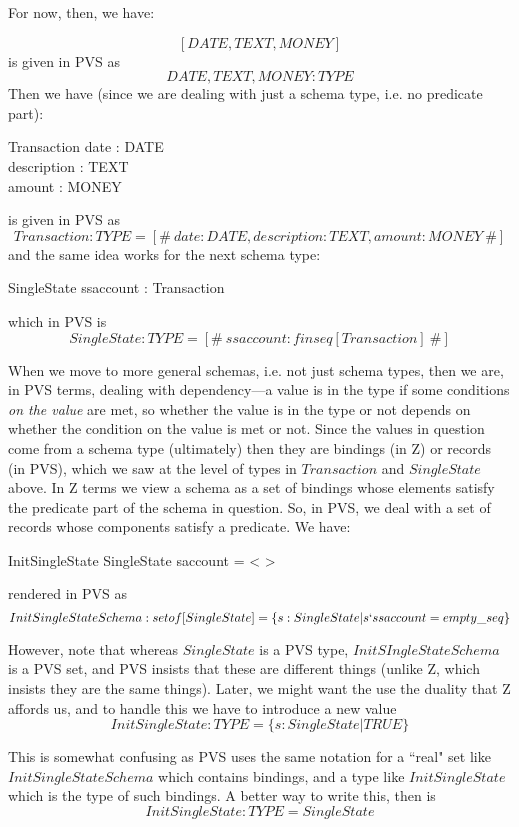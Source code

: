\documentclass[11pt]{amsart}
\begin{document}
For now, then, we have:

\[
[DATE, TEXT, MONEY]
\]
is given in PVS as
\[
DATE, TEXT, MONEY : TYPE
\]
Then we have (since we are dealing with just a schema type, i.e. no predicate part):
\begin{schema}{Transaction}
date : DATE\\
description : TEXT\\
amount : MONEY
\end{schema}
is given in PVS as
\[
Transaction : TYPE = [\#\ date : DATE, description : TEXT, amount : MONEY\ \#]
\]
and the same idea works for the next schema type:
\begin{schema}{SingleState}
ssaccount : \seq Transaction
\end{schema}
which in PVS is
\[
SingleState : TYPE = [\#\ ssaccount :  finseq[Transaction]\ \#]
\]

When we move to more general schemas, i.e. not just schema types, then we are, in PVS terms, dealing with dependency---a value is in the type if some conditions \emph{on the value} are met, so whether the value is in the type or not depends on whether the condition on the value is met or not. Since the values in question come from a schema type (ultimately) then they are bindings (in Z) or records (in PVS), which we saw at the level of types in $Transaction$ and $SingleState$ above. In Z terms we view a schema as a set of bindings whose elements satisfy the predicate part of the schema in question. So, in PVS, we deal with a set of records whose components satisfy a predicate. We have:

\begin{schema}{InitSingleState}
SingleState
\where
saccount = < >
\end{schema}
rendered in PVS as
\[
InitSingleStateSchema : setof[SingleState] = \{ s : SingleState | s`ssaccount = empty\_seq\}
\]

However, note that whereas $SingleState$ is a PVS type, $InitSIngleStateSchema$ is a PVS set, and PVS insists that these are different things (unlike Z, which insists they are the same things). Later, we might want the use the duality that Z affords us, and to handle this we have to introduce a new value
\[
InitSingleState : TYPE = \{ s : SingleState | TRUE \}
\]

This is somewhat confusing as PVS uses the same notation for a ``real" set like $InitSingleStateSchema$ which contains bindings, and a type like $InitSingleState$ which is the type of such bindings. A better way to write this, then is
\[
InitSingleState : TYPE = SingleState
\]
\end{document}

